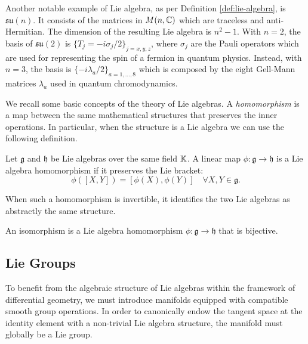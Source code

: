\begin{example}\label{ex:su-n}
	Another notable example of Lie algebra, as per Definition \ref{def:lie-algebra}, is $\mathfrak{su}(n)$. It consists of the matrices in $M(n, \mathbb{C})$ which are traceless and anti-Hermitian. The dimension of the resulting Lie algebra is $n^2 -1$. With $n=2$, the basis of $\mathfrak{su}(2)$ is $\{T_j = -i\sigma_j/2\}_{j=x,y,z}$, where $\sigma_j$ are the Pauli operators which are used for representing the spin of a fermion in quantum physics. Instead, with $n=3$, the basis is $\{-i\lambda_a/2\}_{a=1,...,8}$ which is composed by the eight Gell-Mann matrices $\lambda_a$ used in quantum chromodynamics.
\end{example}

We recall some basic concepts of the theory of Lie algebras.
A \textit{homomorphism} is a map between the same mathematical structures that preserves the inner operations. In particular, when the structure is a Lie algebra we can use the following definition.

\begin{definition}\label{def:lie-homo}
Let \(\mathfrak{g}\) and \(\mathfrak{h}\) be Lie algebras over the same field $\mathbb{K}$. A linear map \(\phi: \mathfrak{g} \rightarrow \mathfrak{h}\) is a Lie algebra homomorphism if it preserves the Lie bracket:
\[ 
	\phi([X, Y]) = [\phi(X), \phi(Y)] \quad \forall X, Y \in \mathfrak{g}.
\]
\end{definition}

\noindent When such a homomorphism is invertible, it identifies the two Lie algebras as abstractly the same structure.

\begin{definition}\label{def:lie-iso}
	An isomorphism is a Lie algebra homomorphism \(\phi: \mathfrak{g} \rightarrow \mathfrak{h}\) that is bijective.
\end{definition}

\subsection*{Lie Groups}
To benefit from the algebraic structure of Lie algebras within the framework of differential geometry, we must introduce manifolds equipped with compatible smooth group operations. In order to canonically endow the tangent space at the identity element with a non-trivial Lie algebra structure, the manifold must globally be a Lie group.

